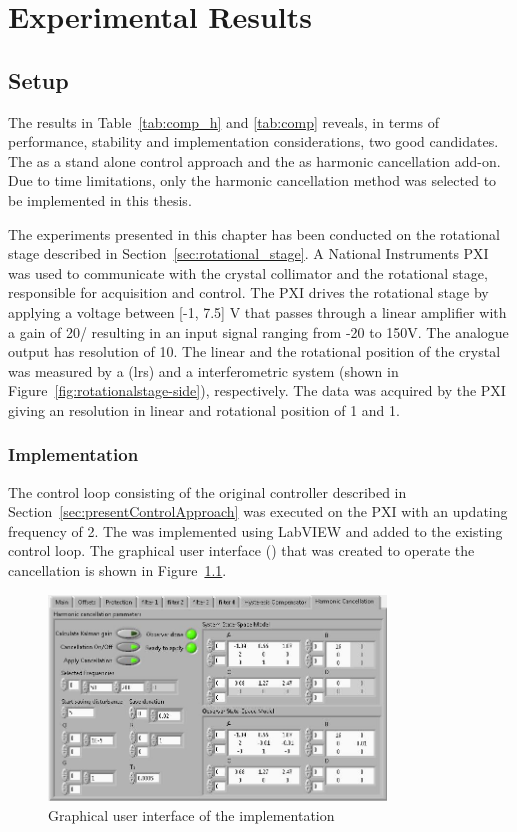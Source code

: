 \chapter{Experimental Results}\label{cha:exp_result}
\section{Setup}\label{sec:setup}
The results in Table~\ref{tab:comp_h} and \ref{tab:comp} reveals, in terms of performance, stability and implementation considerations, two good candidates. The \abbrIRC  as a stand alone control approach and the \abbrRFDC as harmonic cancellation add-on. Due to time limitations, only the harmonic cancellation method was selected to be implemented in this thesis.

The experiments presented in this chapter has been conducted on the rotational stage described in Section~\ref{sec:rotational_stage}. A National Instruments PXI was used to communicate with the crystal collimator and the rotational stage, responsible for acquisition and control. The PXI drives the rotational stage by applying a voltage between [-1, 7.5] V that passes through a linear amplifier with a gain of \unit{20}{\volt/\volt} resulting in an input signal ranging from -20 to 150V. The analogue output has resolution of \unit{10}{\micro\volt}. The linear and the rotational position of the crystal was measured by a (lrs) and a interferometric system (shown in Figure~\ref{fig:rotationalstage-side}), respectively. The data was acquired by the PXI giving an resolution in linear and rotational position of \unit{1}{\nano\radian} and \unit{1}{\milli\meter}.


\subsection{Implementation}
The control loop consisting of the original controller described in Section~\ref{sec:presentControlApproach} was executed on the PXI with an updating frequency of \unit{2}{\kilo\hertz}. The \abbrRFDC was implemented using LabVIEW and added to the existing control loop. The graphical user interface (\abbrGUI) that was created to operate the cancellation is shown in Figure~\ref{fig:gui}.

\begin{figure}[h]
  \centering %
  \includegraphics[width=0.8\textwidth]{fig/HC_gui}
  \caption{\label{fig:gui}Graphical user interface of the \abbrRFDC implementation}
\end{figure}

